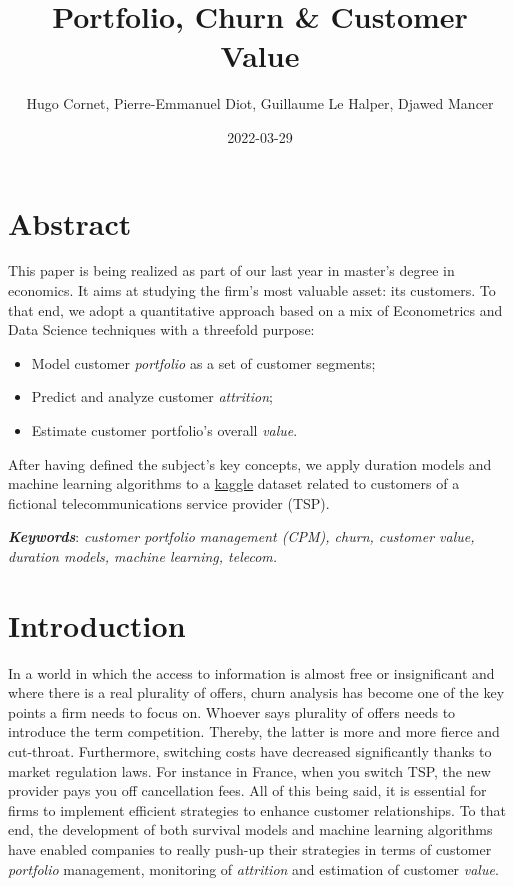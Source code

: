 \documentclass[
]{book}
\title{Portfolio, Churn \& Customer Value}
\author{Hugo Cornet, Pierre-Emmanuel Diot, Guillaume Le Halper, Djawed Mancer}
\date{2022-03-29}
\providecommand{\tightlist}{%
  \setlength{\itemsep}{0pt}\setlength{\parskip}{0pt}}
\begin{document}
\maketitle

{
\setcounter{tocdepth}{1}
\tableofcontents
}
\hypertarget{abstract}{%
\chapter*{Abstract}\label{abstract}}

This paper is being realized as part of our last year in master's degree in economics. It aims at studying the firm's most valuable asset: its customers. To that end, we adopt a quantitative approach based on a mix of Econometrics and Data Science techniques with a threefold purpose:

\begin{itemize}
\tightlist
\item
  Model customer \emph{portfolio} as a set of customer segments;
\item
  Predict and analyze customer \emph{attrition};
\item
  Estimate customer portfolio's overall \emph{value}.
\end{itemize}

After having defined the subject's key concepts, we apply duration models and machine learning algorithms to a \href{https://www.kaggle.com/yeanzc/telco-customer-churn-ibm-dataset}{kaggle} dataset related to customers of a fictional telecommunications service provider (TSP).

\textbf{\emph{Keywords}}: \emph{customer portfolio management (CPM), churn, customer value, duration models, machine learning, telecom.}

\hypertarget{intro}{%
\chapter{Introduction}\label{intro}}

In a world in which the access to information is almost free or insignificant and where there is a real plurality of offers, churn analysis has become one of the key points a firm needs to focus on. Whoever says plurality of offers needs to introduce the term competition. Thereby, the latter is more and more fierce and cut-throat. Furthermore, switching costs have decreased significantly thanks to market regulation laws. For instance in France, when you switch TSP, the new provider pays you off cancellation fees. All of this being said, it is essential for firms to implement efficient strategies to enhance customer relationships. To that end, the development of both survival models and machine learning algorithms have enabled companies to really push-up their strategies in terms of customer \emph{portfolio} management, monitoring of \emph{attrition} and estimation of customer \emph{value}.
\end{document}

